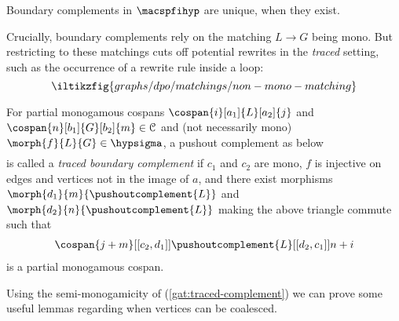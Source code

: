 \begin{proposition}\label{prop:boundary-complement-unique}
    Boundary complements in \(\macspfihyp\) are unique, when they exist.
\end{proposition}

\noindent
Crucially, boundary complements rely on the matching \(L \to G\) being mono.
But restricting to these matchings cuts off potential rewrites in the \emph{traced} setting, such as the occurrence of a rewrite rule inside a loop:
\[
    \iltikzfig{graphs/dpo/matchings/non-mono-matching}
\]
\begin{definition}
    For partial monogamous cospans \(\cospan{i}[a_1]{L}[a_2]{j}\) and \(\cospan{n}[b_1]{G}[b_2]{m} \in \mathcal{C}\) and (not necessarily mono) \(\morph{f}{L}{G} \in \hypsigma\), a pushout complement as below
    \begin{gather}
        \label{gath:traced-boundary complement}
        
    \end{gather}
    is called a \emph{traced boundary complement} if \(c_1\) and \(c_2\) are mono, \(f\) is injective on edges and vertices not in the image of \(a\), and there exist morphisms \(\morph{d_1}{m}{\pushoutcomplement{L}}\) and \(\morph{d_2}{n}{\pushoutcomplement{L}}\) making the above triangle commute such that
    \begin{gather}
        \cospan{j+m}[[c_2,d_1]]{\pushoutcomplement{L}}[[d_2,c_1]]{{n+i}} \label{gat:traced-complement}
    \end{gather} is a partial monogamous cospan.
\end{definition}

\noindent
Using the semi-monogamicity of (\ref{gat:traced-complement}) we can prove some useful lemmas regarding when vertices can be coalesced.

